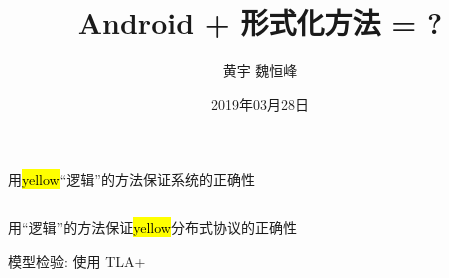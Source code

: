\documentclass[]{beamer}
\title[Android + 形式化方法 = ?]{Android + 形式化方法 = ?}
\subtitle{}
\author[黄宇\; 魏恒峰]{黄宇 \quad 魏恒峰}
\institute{南京大学计算机软件研究所}
\date{2019年03月28日}
\begin{document}
\renewcommand\figurename{} %
\renewcommand\tablename{}  %

\maketitle


\begin{frame}{}

  \vspace{0.30cm}
  \begin{center}
	{\Large 用\hl{yellow}{``逻辑''}的方法保证系统的正确性}
  \end{center}
\end{frame}

\begin{frame}{}
  \begin{columns}
  \end{columns}

  \vspace{0.30cm}
  \begin{center}
	{\Large 用``逻辑''的方法保证\hl{yellow}{分布式协议}的正确性}
  \end{center}
\end{frame}

\begin{frame}{}
  \begin{center}
    {\large 
	  模型检验: 使用 TLA+ \\[5pt]
    }
  \end{center}

  \begin{columns}
  \end{columns}
\end{frame}
\end{document}
